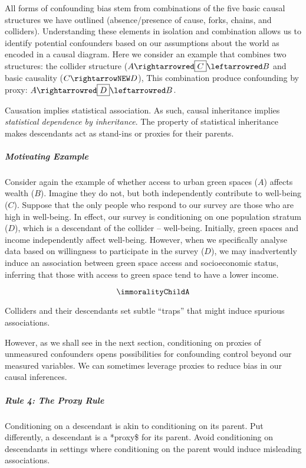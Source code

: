 \documentclass[
  singlecolumn]{article}
\let\oldsubparagraph\subparagraph
\renewcommand{\subparagraph}[1]{\oldsubparagraph{#1}\mbox{}}
\begin{document}
All forms of confounding bias stem from combinations of the five basic
causal structures we have outlined (absence/presence of cause, forks,
chains, and colliders). Understanding these elements in isolation and
combination allows us to identify potential confounders based on our
assumptions about the world as encoded in a causal diagram. Here we
consider an example that combines two structures: the collider structure
(\(A \rightarrowred \boxed{C} \leftarrowred
B\) and basic causality (\(C\rightarrowNEW D\)), This combination
produce confounding by proxy:
\(A \rightarrowred \boxed{D} \leftarrowred B\).

Causation implies statistical association. As such, causal inheritance
implies \emph{statistical dependence by inheritance}. The property of
statistical inheritance makes descendants act as stand-ins or proxies
for their parents.

\subparagraph{Motivating Example}\label{motivating-example-3}

Consider again the example of whether access to urban green spaces
(\(A\)) affects wealth (\(B\)). Imagine they do not, but both
independently contribute to well-being (\(C\)). Suppose that the only
people who respond to our survey are those who are high in well-being.
In effect, our survey is conditioning on one population stratum (\(D\)),
which is a descendant of the collider -- well-being. Initially, green
spaces and income independently affect well-being. However, when we
specifically analyse data based on willingness to participate in the
survey (\(\boxed{D}\)), we may inadvertently induce an association
between green space access and socioeconomic status, inferring that
those with access to green space tend to have a lower income.

\[\immoralityChildA\]

Colliders and their descendants set subtle ``traps'' that might induce
spurious associations.

However, as we shall see in the next section, conditioning on proxies of
unmeasured confounders opens possibilities for confounding control
beyond our measured variables. We can sometimes leverage proxies to
reduce bias in our causal inferences.

\subparagraph{Rule 4: The Proxy Rule}\label{rule-4-the-proxy-rule}

Conditioning on a descendant is akin to conditioning on its parent. Put
differently, a descendant is a *proxy\$ for its parent. Avoid
conditioning on descendants in settings where conditioning on the parent
would induce misleading associations.
\end{document}
